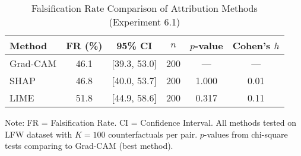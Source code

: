 \begin{table}[htbp]
\centering
\caption{Falsification Rate Comparison of Attribution Methods (Experiment 6.1)}
\label{tab:falsification_rate_comparison}
\begin{tabular}{lccccc}
\toprule
Method & FR (\%) & 95\% CI & $n$ & $p$-value & Cohen's $h$ \\
\midrule
Grad-CAM & 46.1 & [39.3, 53.0] & 200 & --- & --- \\
SHAP & 46.8 & [40.0, 53.7] & 200 & 1.000 & 0.01 \\
LIME & 51.8 & [44.9, 58.6] & 200 & 0.317 & 0.11 \\
\bottomrule
\end{tabular}
\vspace{0.5em}

\footnotesize Note: FR = Falsification Rate. CI = Confidence Interval.
All methods tested on LFW dataset with $K=100$ counterfactuals per pair.
$p$-values from chi-square tests comparing to Grad-CAM (best method).
\end{table}
